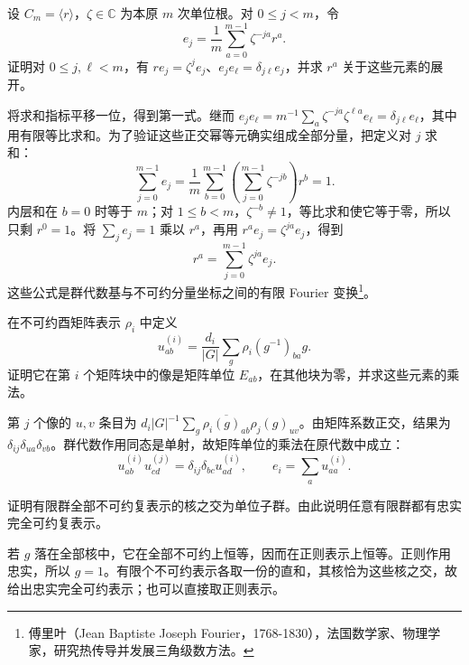 \begin{exercise}\label{b5:ex:02-cyclic-fourier}
	设 \(C_m=\langle r\rangle\)，\(\zeta\in\mathbb C\) 为本原 \(m\) 次单位根。对 \(0\le j<m\)，令
	\[
		e_j=\frac1m\sum_{a=0}^{m-1}\zeta^{-ja}r^a.
	\]
	证明对 \(0\le j,\ell<m\)，有 \(re_j=\zeta^j e_j\)、\(e_je_\ell=\delta_{j\ell}e_j\)，并求 \(r^a\) 关于这些元素的展开。
\end{exercise}
\begin{solution}
	将求和指标平移一位，得到第一式。继而 \(e_je_\ell=m^{-1}\sum_a\zeta^{-ja}\zeta^{\ell a}e_\ell=\delta_{j\ell}e_\ell\)，其中用有限等比求和。为了验证这些正交幂等元确实组成全部分量，把定义对 \(j\) 求和：
	\[
		\sum_{j=0}^{m-1}e_j =\frac1m\sum_{b=0}^{m-1} \left(\sum_{j=0}^{m-1}\zeta^{-jb}\right)r^b=1.
	\]
	内层和在 \(b=0\) 时等于 \(m\)；对 \(1\le b<m\)，\(\zeta^{-b}\ne1\)，等比求和使它等于零，所以只剩 \(r^0=1\)。将 \(\sum_je_j=1\) 乘以 \(r^a\)，再用 \(r^ae_j=\zeta^{ja}e_j\)，得到
	\[
		r^a=\sum_{j=0}^{m-1}\zeta^{ja}e_j.
	\]
	这些公式是群代数基与不可约分量坐标之间的有限 Fourier 变换\footnote{傅里叶（Jean Baptiste Joseph Fourier，1768-1830），法国数学家、物理学家，研究热传导并发展三角级数方法。}。
\end{solution}

\begin{exercise}\label{b5:ex:02-matrix-units}
	在不可约酉矩阵表示 \(\rho_i\) 中定义
	\[
		u^{(i)}_{ab}=\frac{d_i}{|G|}\sum_g\rho_i(g^{-1})_{ba}g.
	\]
	证明它在第 \(i\) 个矩阵块中的像是矩阵单位 \(E_{ab}\)，在其他块为零，并求这些元素的乘法。
\end{exercise}
\begin{solution}
	第 \(j\) 个像的 \(u,v\) 条目为 \(d_i|G|^{-1}\sum_g\overline{\rho_i(g)_{ab}}\rho_j(g)_{uv}\)。由矩阵系数正交，结果为 \(\delta_{ij}\delta_{ua}\delta_{vb}\)。群代数作用同态是单射，故矩阵单位的乘法在原代数中成立：
	\[
		u^{(i)}_{ab}u^{(j)}_{cd}=\delta_{ij}\delta_{bc}u^{(i)}_{ad}, \qquad e_i=\sum_a u^{(i)}_{aa}.
	\]
\end{solution}

\begin{exercise}\label{b5:ex:02-kernels-intersection}
	证明有限群全部不可约复表示的核之交为单位子群。由此说明任意有限群都有忠实完全可约复表示。
\end{exercise}
\begin{solution}
	若 \(g\) 落在全部核中，它在全部不可约上恒等，因而在正则表示上恒等。正则作用忠实，所以 \(g=1\)。有限个不可约表示各取一份的直和，其核恰为这些核之交，故给出忠实完全可约表示；也可以直接取正则表示。
\end{solution}

